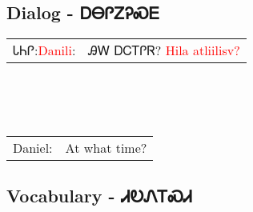 \newpage\subsection{Dialog - ᎠᎾᎵᏃᎮᏍᎬ}
\begin{tabular}{p{2cm} p{11cm}}
ᏓᏂᎵ:\newline \textcolor{red}{Danili}: & ᎯᎳ ᎠᏟᎢᎵᏒ? 
\newline\textcolor{red}{Hila atliilisv?}\\
\end{tabular}
\\
\\
\\
\noindent\begin{tabular}{p{2cm} p{11cm}}Daniel: & At what time?\\
\end{tabular}
\vfill\newpage\subsection{Vocabulary - ᏗᎧᏁᎢᏍᏗ 
}
